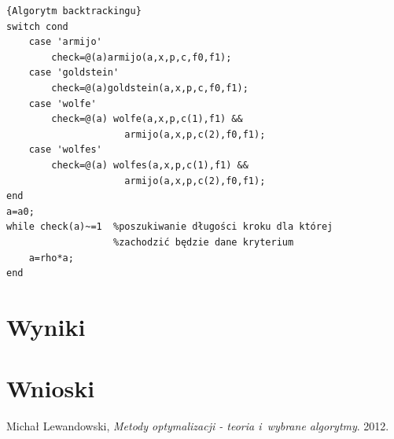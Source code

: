 \documentclass{classrep}
\begin{document}
\begin{lstlisting}{Algorytm backtrackingu}
switch cond
    case 'armijo'
        check=@(a)armijo(a,x,p,c,f0,f1);
    case 'goldstein'
        check=@(a)goldstein(a,x,p,c,f0,f1);
    case 'wolfe'
        check=@(a) wolfe(a,x,p,c(1),f1) &&
        			 armijo(a,x,p,c(2),f0,f1);
    case 'wolfes'
        check=@(a) wolfes(a,x,p,c(1),f1) &&
        			 armijo(a,x,p,c(2),f0,f1);
end
a=a0;
while check(a)~=1  %poszukiwanie długości kroku dla której
                   %zachodzić będzie dane kryterium
    a=rho*a;
end

\end{lstlisting}

\section{Wyniki}
	
\section{Wnioski}

\begin{thebibliography}{9}
	Michał Lewandowski,  \emph{Metody optymalizacji - teoria i~wybrane algorytmy}.  2012.
\end{thebibliography}
\end{document}
